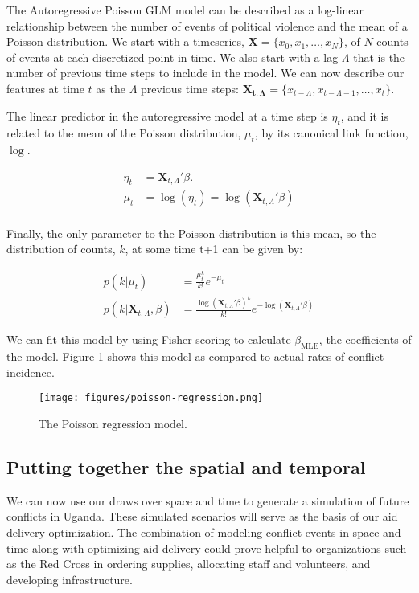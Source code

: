 \documentclass{article} %
\begin{document}
The Autoregressive Poisson GLM model can be described as a log-linear relationship between the number of events of political violence and the mean of a Poisson distribution. We start with a timeseries, $\mathbf{X} = \{x_0, x_1,\hdots, x_N\}$, of $N$ counts of events at each discretized point in time. We also start with a lag $\Lambda$ that is the number of previous time steps to include in the model. We can now describe our features at time $t$ as the $\Lambda$ previous time steps: $\mathbf{X_{t, \Lambda}} = \{x_{t-\Lambda}, x_{t-\Lambda-1},\hdots, x_t\}$.

The linear predictor in the autoregressive model at a time step is $\eta_t$, and it is related to the mean of the Poisson distribution, $\mu_t$, by its canonical link function, $\log$.

\begin{align*}
\eta_t &= \mathbf{X}_{t, \Lambda}'\beta. \\
\mu_t &= \log(\eta_t) = \log(\mathbf{X}_{t, \Lambda}'\beta) \\
\end{align*}

Finally, the only parameter to the Poisson distribution is this mean, so the distribution of counts, $k$, at some time t+1 can be given by:

\begin{align*}
p(k | \mu_t) &= \frac{\mu_t^k}{k!}e^{-\mu_t} \\
p(k | \mathbf{X}_{t, \Lambda}, \beta) &= \frac{\log(\mathbf{X}_{t, \Lambda}'\beta)^k}{k!}e^{-\log(\mathbf{X}_{t, \Lambda}'\beta)} 
\end{align*}

We can fit this model by using Fisher scoring to calculate $\beta_\mathrm{MLE}$, the coefficients of the model. Figure \ref{fig:poisson} shows this model as compared to actual rates of conflict incidence.

\begin{figure}
\centering
\texttt{[image: figures/poisson-regression.png]}
\caption{The Poisson regression model.}
\label{fig:poisson}
\end{figure}

\subsection{Putting together the spatial and temporal}

We can now use our draws over space and time to generate a simulation of future conflicts in Uganda. These simulated scenarios will serve as the basis of our aid delivery optimization. The combination of modeling conflict events in space and time along with optimizing aid delivery could prove helpful to organizations such as the Red Cross in ordering supplies, allocating staff and volunteers, and developing infrastructure.
\end{document}
